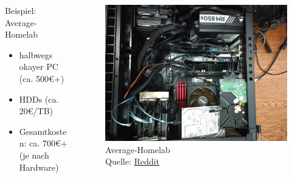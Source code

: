 \documentclass[
    ngerman,
    accentcolor=3b,
    fontsize= 12pt,
    a4paper,
    aspectratio=169,
    colorback=true,
    fancy_row_colors,
    leqno,
    fleqn,
    boxarc=3pt,
    fleqn,
    main,
    design=2008,
]{algoslides}
\begin{document}
    \begin{frame}
        \slidehead{}
        \begin{columns}[T]
            \begin{column}{.5\textwidth}
                Beispiel: Average-Homelab
                \begin{itemize}
                    \item halbwegs okayer PC (ca. 500€+)
                    \item HDDs (ca. 20€/TB)
                    \item Gesamtkosten: ca. 700€+ (je nach Hardware)
                \end{itemize}
            \end{column}%
            \begin{column}{.5\textwidth}
                \begin{figure}[ht!]
                    \centering
                    \includegraphics[height=.5\textheight]{average-setup.png}
                    \caption{Average-Homelab\\Quelle: \href{https://www.reddit.com/r/unRAID/comments/j6fcji/seven_35_hard_drives_in_a_mid_tower/}{Reddit}}
                    \label{fig:average-homelab}
                \end{figure}
            \end{column}%
        \end{columns}
    \end{frame}
\end{document}
